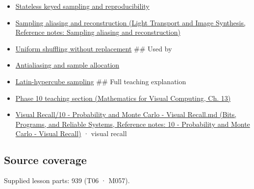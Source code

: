 \hypertarget{appendix-9f693ffd82bc-prerequisites}{}

\begin{itemize}
\item
  \hyperref[appendix-daaf25bfd3a0]{Stateless keyed sampling and reproducibility}
\item
  \href{../04-Light-Transport-and-Image-Synthesis/main.pdf\#nameddest=appendix-6a7869dd79a6}{Sampling aliasing and reconstruction (Light Transport and Image Synthesis, Reference notes: Sampling aliasing and reconstruction)}
\item
  \hyperref[appendix-184fcc411663]{Uniform shuffling without replacement} \#\# Used by
\item
  \hyperref[appendix-4192b2bdd21e]{Antialiasing and sample allocation}
\item
  \hyperref[appendix-1c5e85693a06]{Latin-hypercube sampling} \#\# Full teaching explanation
\item
  \href{../02-Mathematics-for-Visual-Computing/main.pdf\#nameddest=02-foundations-ii-ch029-a-computer-produces-deterministic-pseudorandom-sequences}{Phase 10 teaching section (Mathematics for Visual Computing, Ch. 13)}
\item
  \href{../01-Bits-Programs-and-Reliable-Systems/main.pdf\#nameddest=appendix-cb5af353ef77}{Visual Recall/10 - Probability and Monte Carlo - Visual Recall.md (Bits, Programs, and Reliable Systems, Reference notes: 10 - Probability and Monte Carlo - Visual Recall)} · visual recall
\end{itemize}

\subsection{Source coverage}\label{appendix-9f693ffd82bc-source-coverage}

\hypertarget{appendix-9f693ffd82bc-source-coverage}{}

Supplied lesson parts: 939 (T06 · M057).
